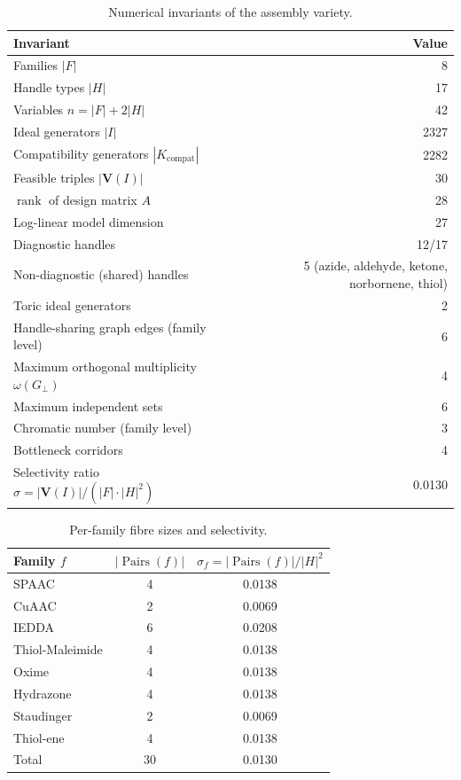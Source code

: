 \documentclass[preprint,12pt]{elsarticle}
\theoremstyle{definition}
\theoremstyle{remark}
\newcommand{\Var}{\mathbf{V}}
\DeclareMathOperator{\Pairs}{Pairs}
\DeclareMathOperator{\rank}{rank}
\begin{document}
\begin{table}[ht]
\centering
\caption{Numerical invariants of the assembly variety.}
\label{tab:invariants}
\begin{tabular}{@{}lr@{}}
\toprule
Invariant & Value \\
\midrule
Families $|F|$ & 8 \\
Handle types $|H|$ & 17 \\
Variables $n = |F| + 2|H|$ & 42 \\
Ideal generators $|I|$ & 2327 \\
Compatibility generators $|K_{\mathrm{compat}}|$ & 2282 \\
Feasible triples $|\Var(I)|$ & 30 \\
$\rank$ of design matrix $A$ & 28 \\
Log-linear model dimension & 27 \\
Diagnostic handles & 12/17 \\
Non-diagnostic (shared) handles & 5 (azide, aldehyde, ketone, norbornene, thiol) \\
Toric ideal generators & 2 \\
Handle-sharing graph edges (family level) & 6 \\
Maximum orthogonal multiplicity $\omega(G_\perp)$ & 4 \\
Maximum independent sets & 6 \\
Chromatic number (family level) & 3 \\
Bottleneck corridors & 4 \\
Selectivity ratio $\sigma = |\Var(I)|/(|F| \cdot |H|^2)$ & 0.0130 \\
\bottomrule
\end{tabular}
\end{table}

\begin{table}[ht]
\centering
\caption{Per-family fibre sizes and selectivity.}
\label{tab:fibres}
\begin{tabular}{@{}lcc@{}}
\toprule
Family $f$ & $|\Pairs(f)|$ & $\sigma_f = |\Pairs(f)| / |H|^2$ \\
\midrule
SPAAC & 4 & 0.0138 \\
CuAAC & 2 & 0.0069 \\
IEDDA & 6 & 0.0208 \\
Thiol-Maleimide & 4 & 0.0138 \\
Oxime & 4 & 0.0138 \\
Hydrazone & 4 & 0.0138 \\
Staudinger & 2 & 0.0069 \\
Thiol-ene & 4 & 0.0138 \\
\midrule
Total & 30 & 0.0130 \\
\bottomrule
\end{tabular}
\end{table}
\end{document}
